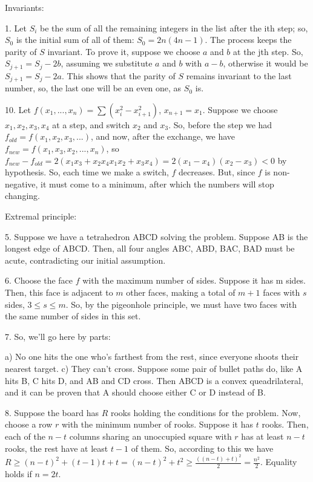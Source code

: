 \documentclass[12pt]{minimal}
\begin{document}
Invariants:

1.  Let $S_i$ be the sum of all the remaining integers in the list after the ith
    step; so, $S_0$ is the initial sum of all of them: $S_0 = 2n(4n - 1)$. The
    process keeps the parity of $S$ invariant. To prove it, suppose we choose
    $a$ and $b$ at the jth step. So, $S_{j + 1} = S_j - 2b$, assuming we
    substitute $a$ and $b$ with $a - b$, otherwise it would be $S_{j + 1} = S_j
    - 2a$. This shows that the parity of $S$ remains invariant to the last
    number, so, the last one will be an even one, as $S_0$ is.

10. Let $f(x_1, ..., x_n) = \sum{(x_i^2 - x_{i + 1}^2)}$, $x_{n + 1} = x_1$. Suppose
    we choose $x_1, x_2, x_3, x_4$ at a step, and switch $x_2$ and $x_3$. So,
    before the step we had $f_{old} = f(x_1, x_2, x_3, ...)$, and now, after the
    exchange, we have $f_{new} = f(x_1, x_3, x_2, ..., x_n)$, so $f_{new} -
    f_{old} = 2(x_1 x_3 + x_2 x_4 x_1 x_2 + x_3 x_4) = 2(x_1 - x_4)(x_2 - x_3)
    < 0$ by hypothesis. So, each time we make a switch, $f$ decreases. But,
    since $f$ is non-negative, it must come to a minimum, after which the
    numbers will stop changing.

Extremal principle:

5.  Suppose we have a tetrahedron ABCD solving the problem. Suppose AB is the
    longest edge of ABCD. Then, all four angles ABC, ABD, BAC, BAD must be acute,
    contradicting our initial assumption.

6.  Choose the face $f$ with the maximum number of sides. Suppose it has m sides.
    Then, this face is adjacent to $m$ other faces, making a total of $m+1$
    faces with $s$ sides, $3 \leq s \leq m$. So, by the pigeonhole principle, we
    must have two faces with the same number of sides in this set.

7.  So, we'll go here by parts:

    a)  No one hits the one who's farthest from the rest, since everyone shoots
        their nearest target.
    c)  They can't cross. Suppose some pair of bullet paths do, like A hits B,
        C hits D, and AB and CD cross. Then ABCD is a convex queadrilateral, and
        it can be proven that A should choose either C or D instead of B.

8.  Suppose the board has $R$ rooks holding the conditions for the problem. Now, 
    choose a row $r$ with the minimum number of rooks. Suppose it has $t$ rooks.
    Then, each of the $n - t$ columns sharing an unoccupied square with $r$ has
    at least $n - t$ rooks, the rest have at least $t - 1$ of them. So,
    according to this we have $R \geq (n - t)^2 + (t - 1)t + t =(n - t)^2 + t^2
    \geq \frac{((n - t) + t)^2}{2} = \frac{n^2}{2}$. Equality holds if $n = 2t$.
\end{document}
